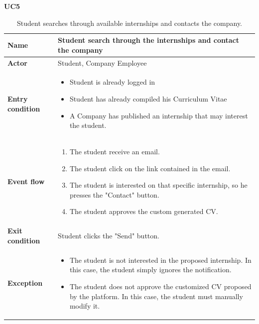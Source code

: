     \textbf{UC5}
    \nopagebreak
    \begin{table}[H]
    \centering
    \begin{tabular}{|l|p{11.9cm}|}
        \hline
        \textbf{Name}            & Student search through the internships and contact the company \\\hline
        \textbf{Actor}           & Student, Company Employee         \\\hline
        \textbf{Entry condition} &
        \begin{itemize}
              \item Student is already logged in
              \item Student has already compiled his Curriculum Vitae
              \item A Company has published an internship that may interest the student.
        \end{itemize}                                        \\\hline
        \textbf{Event flow}      &
        \begin{enumerate}[label=\arabic*.]
              \item The student receive an email.
              \item The student click on the link contained in the email.
              \item The student is interested on that specific internship, so he presses the "Contact" button.
              \item The student approves the custom generated CV.
        \end{enumerate}            \\\hline
        \textbf{Exit condition}  & Student clicks the "Send" button.\\\hline
        \textbf{Exception}       &  
        \begin{itemize}
            \item The student is not interested in the proposed internship. In this case, the student simply ignores the notification.
            \item The student does not approve the customized CV proposed by the platform. In this case, the student must manually modify it.
        \end{itemize} 
        \\\hline
    \end{tabular}
    \caption{Student searches through available internships and contacts the company.}
    \label{table:Student search through the internhisps and contact the company}
    \end{table}
    
